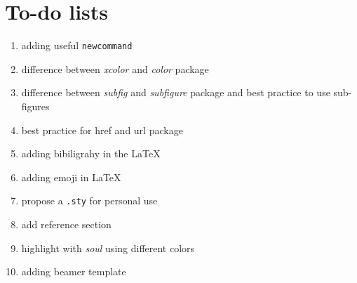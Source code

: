\section{To-do lists}

\begin{enumerate}
    \item adding useful \texttt{newcommand}
    \item difference between \textit{xcolor} and \textit{color} package
    \item difference between \textit{subfig} and \textit{subfigure} package and best practice to use sub-figures
    \item best practice for href and url package
    \item adding bibiligrahy in the \LaTeX
    \item adding emoji in \LaTeX
    \item propose a \texttt{.sty} for personal use
    \item add reference section
    \item highlight with \textit{soul} using different colors
    \item adding beamer template
\end{enumerate}